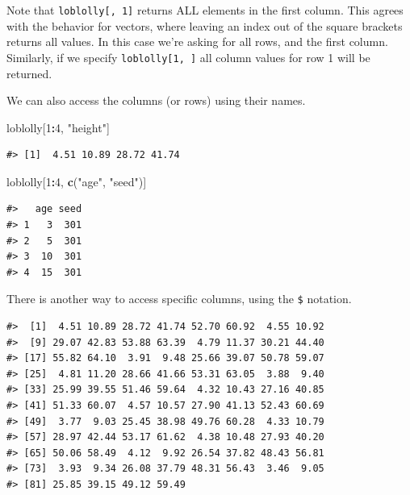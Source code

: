 \documentclass[
  11pt,
]{krantz}
\newenvironment{Shaded}{\begin{snugshade}}{\end{snugshade}}
\newcommand{\DecValTok}[1]{\textcolor[rgb]{0.00,0.00,0.81}{#1}}
\newcommand{\KeywordTok}[1]{\textcolor[rgb]{0.13,0.29,0.53}{\textbf{#1}}}
\newcommand{\NormalTok}[1]{#1}
\newcommand{\OperatorTok}[1]{\textcolor[rgb]{0.81,0.36,0.00}{\textbf{#1}}}
\newcommand{\StringTok}[1]{\textcolor[rgb]{0.31,0.60,0.02}{#1}}
\theoremstyle{definition}
\theoremstyle{definition}
\theoremstyle{definition}
\theoremstyle{definition}
\theoremstyle{remark}
\begin{document}
Note that \texttt{loblolly{[},\ 1{]}} returns ALL elements in the first column. This agrees with the behavior for vectors, where leaving an index out of the square brackets returns all values. In this case we're asking for all rows, and the first column. Similarly, if we specify \texttt{loblolly{[}1,\ {]}} all column values for row 1 will be returned.

We can also access the columns (or rows) using their names.

\begin{Shaded}
\begin{Highlighting}[]
\NormalTok{loblolly[}\DecValTok{1}\OperatorTok{:}\DecValTok{4}\NormalTok{, }\StringTok{"height"}\NormalTok{]}
\end{Highlighting}
\end{Shaded}

\begin{verbatim}
#> [1]  4.51 10.89 28.72 41.74
\end{verbatim}

\begin{Shaded}
\begin{Highlighting}[]
\NormalTok{loblolly[}\DecValTok{1}\OperatorTok{:}\DecValTok{4}\NormalTok{, }\KeywordTok{c}\NormalTok{(}\StringTok{"age"}\NormalTok{, }\StringTok{"seed"}\NormalTok{)]}
\end{Highlighting}
\end{Shaded}

\begin{verbatim}
#>   age seed
#> 1   3  301
#> 2   5  301
#> 3  10  301
#> 4  15  301
\end{verbatim}

There is another way to access specific columns, using the \texttt{\$} notation.

\begin{Shaded}
\end{Shaded}

\begin{verbatim}
#>  [1]  4.51 10.89 28.72 41.74 52.70 60.92  4.55 10.92
#>  [9] 29.07 42.83 53.88 63.39  4.79 11.37 30.21 44.40
#> [17] 55.82 64.10  3.91  9.48 25.66 39.07 50.78 59.07
#> [25]  4.81 11.20 28.66 41.66 53.31 63.05  3.88  9.40
#> [33] 25.99 39.55 51.46 59.64  4.32 10.43 27.16 40.85
#> [41] 51.33 60.07  4.57 10.57 27.90 41.13 52.43 60.69
#> [49]  3.77  9.03 25.45 38.98 49.76 60.28  4.33 10.79
#> [57] 28.97 42.44 53.17 61.62  4.38 10.48 27.93 40.20
#> [65] 50.06 58.49  4.12  9.92 26.54 37.82 48.43 56.81
#> [73]  3.93  9.34 26.08 37.79 48.31 56.43  3.46  9.05
#> [81] 25.85 39.15 49.12 59.49
\end{verbatim}
\end{document}
